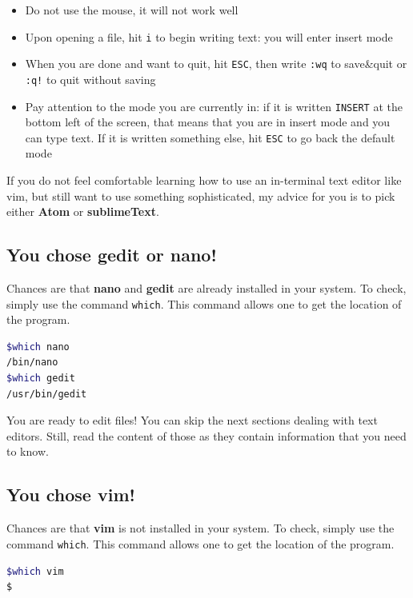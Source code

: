 \documentclass[12pt]{article}
\begin{document}
\begin{itemize}
\item Do not use the mouse, it will not work well
\item Upon opening a file, hit \texttt{i} to begin writing text: you will enter insert mode
\item When you are done and want to quit, hit \texttt{ESC}, then write \texttt{:wq} to save\&quit or \texttt{:q!} to quit without saving
\item Pay attention to the mode you are currently in: if it is written \texttt{INSERT} at the bottom left of the screen, that means that you are in insert mode and you can type text. If it is written something else, hit \texttt{ESC} to go back the default mode
\end{itemize}

If you do not feel comfortable learning how to use an in-terminal text editor like vim, but still want to use something sophisticated, my advice for you is to pick either \textbf{Atom} or \textbf{sublimeText}.

\subsection{You chose gedit or nano!}

Chances are that \textbf{nano} and \textbf{gedit} are already installed in your system. To check, simply use the command \texttt{which}. This command allows one to get the location of the program.

\begin{lstlisting}[language=bash]
$which nano
/bin/nano
$which gedit
/usr/bin/gedit
\end{lstlisting}

You are ready to edit files! You can skip the next sections dealing with text editors. Still, read the content of those as they contain information that you need to know.

\subsection{You chose vim!}

Chances are that \textbf{vim} is not installed in your system. To check, simply use the command \texttt{which}. This command allows one to get the location of the program.

\begin{lstlisting}[language=bash]
$which vim
$
\end{lstlisting}
\end{document}
